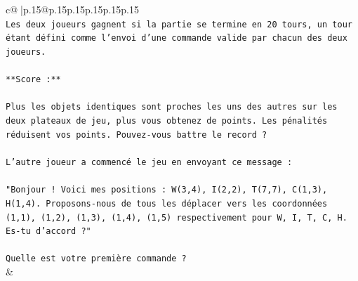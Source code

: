 \documentclass{article}
\begin{document}
{\begin{supertabular}{c@{$\;$}|p{.15\linewidth}@{}p{.15\linewidth}p{.15\linewidth}p{.15\linewidth}p{.15\linewidth}p{.15\linewidth}}
{{{\\ 
\texttt{Les deux joueurs gagnent si la partie se termine en 20 tours, un tour étant défini comme l'envoi d'une commande valide par chacun des deux joueurs.} \\
\\ 
\texttt{**Score :**} \\
\\ 
\texttt{Plus les objets identiques sont proches les uns des autres sur les deux plateaux de jeu, plus vous obtenez de points. Les pénalités réduisent vos points. Pouvez{-}vous battre le record ?} \\
\\ 
\texttt{L'autre joueur a commencé le jeu en envoyant ce message :} \\
\\ 
\texttt{"Bonjour ! Voici mes positions : W(3,4), I(2,2), T(7,7), C(1,3), H(1,4). Proposons{-}nous de tous les déplacer vers les coordonnées (1,1), (1,2), (1,3), (1,4), (1,5) respectivement pour W, I, T, C, H. Es{-}tu d'accord ?"} \\
\\ 
\texttt{Quelle est votre première commande ?} \\
            }
        }
    }
    & \\ \\


\end{supertabular}}
\end{document}
